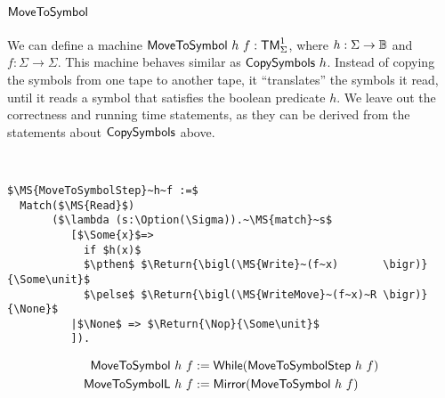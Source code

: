 \section{$\MS{MoveToSymbol}$}
\label{sec:MoveToSymbol}

We can define a machine $\mathsf{MoveToSymbol}~h~f : \mathsf{TM}_\Sigma^1$, where $h:\Sigma\rightarrow\mathbb{B}$ and $f:\Sigma\to\Sigma$.  This machine behaves similar as
$\mathsf{CopySymbols}~h$.  Instead of copying the symbols from one tape to another tape, it ``translates'' the symbols it read, until it reads a symbol
that satisfies the boolean predicate $h$.  We leave out the correctness and running time statements, as they can be derived from the statements about
$\mathsf{CopySymbols}$ above.

\begin{definition}[$\MS{MoveToSymbol}$][MoveToSymbol]
  ~
\begin{lstlisting}[style=semicoqstyle]
$\MS{MoveToSymbolStep}~h~f :=$
  Match($\MS{Read}$)
       ($\lambda (s:\Option(\Sigma)).~\MS{match}~s$
          [$\Some{x}$=> 
            if $h(x)$
            $\pthen$ $\Return{\bigl(\MS{Write}~(f~x)       \bigr)}{\Some\unit}$ 
            $\pelse$ $\Return{\bigl(\MS{WriteMove}~(f~x)~R \bigr)}{\None}$ 
          |$\None$ => $\Return{\Nop}{\Some\unit}$ 
          ]).
\end{lstlisting}
  \begin{align*}
    \mathsf{MoveToSymbol }~h~f &:= \mathsf{While}(\mathsf{MoveToSymbolStep}~h~f) \\
    \mathsf{MoveToSymbolL}~h~f &:= \mathsf{Mirror}(\mathsf{MoveToSymbol}~h~f)
  \end{align*}
\end{definition}



